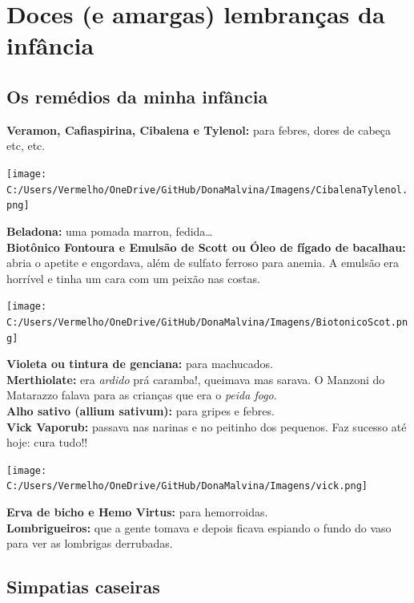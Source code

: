 \documentclass[12pt,brazil,]{book}
\begin{document}
\section{Doces (e amargas) lembranças da
infância}\label{doces-e-amargas-lembranuxe7as-da-infuxe2ncia}

\subsection{Os remédios da minha
infância}\label{os-remuxe9dios-da-minha-infuxe2ncia}

\textbf{Veramon, Cafiaspirina, Cibalena e Tylenol:} para febres, dores
de cabeça etc, etc.

\texttt{[image: C:/Users/Vermelho/OneDrive/GitHub/DonaMalvina/Imagens/CibalenaTylenol.png]}

\textbf{Beladona:} uma pomada marron, fedida\ldots{}\\
\textbf{Biotônico Fontoura e Emulsão de Scott ou Óleo de fígado de
bacalhau:} abria o apetite e engordava, além de sulfato ferroso para
anemia. A emulsão era horrível e tinha um cara com um peixão nas costas.

\texttt{[image: C:/Users/Vermelho/OneDrive/GitHub/DonaMalvina/Imagens/BiotonicoScot.png]}

\textbf{Violeta ou tintura de genciana:} para machucados.\\
\textbf{Merthiolate:} era \emph{ardido} prá caramba!, queimava mas
sarava. O Manzoni do Matarazzo falava para as crianças que era o
\emph{peida fogo}.\\
\textbf{Alho sativo (allium sativum):} para gripes e febres.\\
\textbf{Vick Vaporub:} passava nas narinas e no peitinho dos pequenos.
Faz sucesso até hoje: cura tudo!!

\texttt{[image: C:/Users/Vermelho/OneDrive/GitHub/DonaMalvina/Imagens/vick.png]}

\textbf{Erva de bicho e Hemo Virtus:} para hemorroidas.\\
\textbf{Lombrigueiros:} que a gente tomava e depois ficava espiando o
fundo do vaso para ver as lombrigas derrubadas.

\subsection{Simpatias caseiras}\label{simpatias-caseiras}
\end{document}
